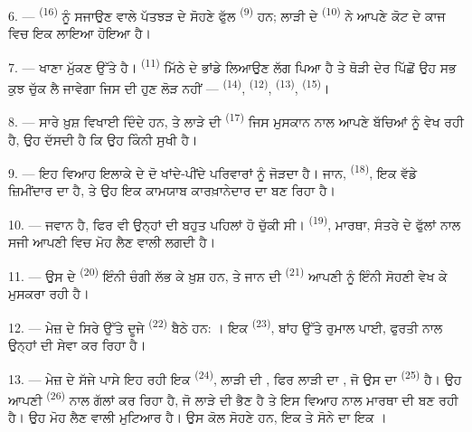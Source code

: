 6. ---  \textsuperscript{(16)} ਨੂੰ ਸਜਾਉਣ ਵਾਲੇ ਪੱਤਝੜ ਦੇ ਸੋਹਣੇ ਫੁੱਲ
 \textsuperscript{(9)} ਹਨ; ਲਾੜੀ ਦੇ 
\textsuperscript{(10)} ਨੇ ਆਪਣੇ ਕੋਟ ਦੇ ਕਾਜ ਵਿਚ ਇਕ ਲਾਇਆ ਹੋਇਆ ਹੈ।

7. --- ਖਾਣਾ ਮੁੱਕਣ ਉੱਤੇ ਹੈ।  \textsuperscript{(11)} ਮਿੱਠੇ ਦੇ ਭਾਂਡੇ
ਲਿਆਉਣ ਲੱਗ ਪਿਆ ਹੈ ਤੇ ਥੋੜੀ ਦੇਰ ਪਿੱਛੋਂ ਉਹ ਸਭ ਕੁਝ ਚੁੱਕ ਲੈ ਜਾਵੇਗਾ ਜਿਸ ਦੀ ਹੁਣ ਲੋੜ
ਨਹੀਂ —  \textsuperscript{(14)}, 
\textsuperscript{(12)},  \textsuperscript{(13)},
 \textsuperscript{(15)}।

\VUsaut{3.0mm}

8. --- ਸਾਰੇ ਖ਼ੁਸ਼ ਵਿਖਾਈ ਦਿੰਦੇ ਹਨ, ਤੇ ਲਾੜੇ ਦੀ  \textsuperscript{(17)}
ਜਿਸ ਮੁਸਕਾਨ ਨਾਲ ਆਪਣੇ ਬੱਚਿਆਂ ਨੂੰ ਵੇਖ ਰਹੀ ਹੈ, ਉਹ ਦੱਸਦੀ ਹੈ ਕਿ ਉਹ ਕਿੰਨੀ ਸੁਖੀ ਹੈ।

9. --- ਇਹ ਵਿਆਹ ਇਲਾਕੇ ਦੇ ਦੋ ਖਾਂਦੇ-ਪੀਂਦੇ ਪਰਿਵਾਰਾਂ ਨੂੰ ਜੋੜਦਾ ਹੈ। ਜਾਨ,
 \textsuperscript{(18)}, ਇਕ ਵੱਡੇ ਜ਼ਿਮੀਂਦਾਰ ਦਾ  ਹੈ, ਤੇ
ਉਹ ਇਕ ਕਾਮਯਾਬ ਕਾਰਖ਼ਾਨੇਦਾਰ ਦਾ  ਬਣ ਰਿਹਾ ਹੈ।

10. ---  ਜਵਾਨ ਹੈ, ਫਿਰ ਵੀ ਉਨ੍ਹਾਂ ਦੀ  ਬਹੁਤ ਪਹਿਲਾਂ ਹੋ
ਚੁੱਕੀ ਸੀ।  \textsuperscript{(19)}, ਮਾਰਥਾ, ਸੰਤਰੇ ਦੇ ਫੁੱਲਾਂ ਨਾਲ
ਸਜੀ ਆਪਣੀ  ਵਿਚ ਮੋਹ ਲੈਣ ਵਾਲੀ ਲਗਦੀ ਹੈ।

11. --- ਉਸ ਦੇ  \textsuperscript{(20)} ਇੰਨੀ ਚੰਗੀ  ਲੱਭ
ਕੇ ਖ਼ੁਸ਼ ਹਨ, ਤੇ ਜਾਨ ਦੀ  \textsuperscript{(21)} ਆਪਣੀ  ਨੂੰ
ਇੰਨੀ ਸੋਹਣੀ ਵੇਖ ਕੇ ਮੁਸਕਰਾ ਰਹੀ ਹੈ।

12. --- ਮੇਜ਼ ਦੇ ਸਿਰੇ ਉੱਤੇ ਦੂਜੇ  \textsuperscript{(22)} ਬੈਠੇ ਹਨ:
। ਇਕ  \textsuperscript{(23)},
ਬਾਂਹ ਉੱਤੇ ਰੁਮਾਲ ਪਾਈ, ਫੁਰਤੀ ਨਾਲ ਉਨ੍ਹਾਂ ਦੀ ਸੇਵਾ ਕਰ ਰਿਹਾ ਹੈ।

\VUsaut{3.0mm}

13. --- ਮੇਜ਼ ਦੇ ਸੱਜੇ ਪਾਸੇ ਇਹ ਰਹੀ ਇਕ  \textsuperscript{(24)}, ਲਾੜੀ
ਦੀ , ਫਿਰ ਲਾੜੀ ਦਾ , ਜੋ ਉਸ ਦਾ 
\textsuperscript{(25)} ਹੈ। ਉਹ ਆਪਣੀ  \textsuperscript{(26)} ਨਾਲ ਗੱਲਾਂ
ਕਰ ਰਿਹਾ ਹੈ, ਜੋ ਲਾੜੇ ਦੀ ਭੈਣ ਹੈ ਤੇ ਇਸ ਵਿਆਹ ਨਾਲ ਮਾਰਥਾ ਦੀ  ਬਣ ਰਹੀ ਹੈ।
ਉਹ ਮੋਹ ਲੈਣ ਵਾਲੀ ਮੁਟਿਆਰ ਹੈ। ਉਸ ਕੋਲ ਸੋਹਣੇ  ਹਨ, ਇਕ
 ਤੇ ਸੋਨੇ ਦਾ ਇਕ ।

